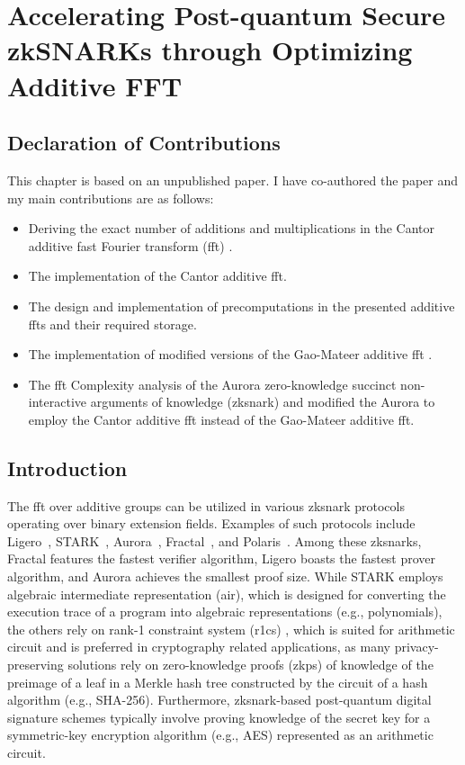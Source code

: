 \chapter{Accelerating Post-quantum Secure zkSNARKs through Optimizing Additive FFT}\label{ch:additive-fft}

\section*{Declaration of Contributions}
This chapter is based on an unpublished paper. I have co-authored the paper and my main contributions are as follows:
\begin{itemize}
	\item Deriving the exact number of additions and multiplications in the Cantor additive fast Fourier transform (\gls{fft}) \cite{Cantor1989FFT}. 
	\item The \CC implementation of the Cantor additive \gls{fft}.
	\item The design and implementation of precomputations in the presented additive \gls{fft}s and their required storage.
	\item The \CC implementation of modified versions of the Gao-Mateer additive \gls{fft} \cite{Gao2010FFT}.
	\item  The \gls{fft} Complexity analysis of the Aurora zero-knowledge succinct non-interactive arguments of knowledge (\gls{zksnark}) and modified the Aurora  \CC  to employ  the Cantor additive \gls{fft} instead of  the Gao-Mateer additive \gls{fft}.
\end{itemize}

\section{Introduction}

The \gls{fft} over additive groups can be utilized in various \gls{zksnark} protocols operating over binary extension fields. Examples of such protocols include Ligero~\cite{Ames2017Ligero}, STARK~\cite{Ben-Sasson2018STARK}, Aurora~\cite{Aurora2019}, Fractal~\cite{Chiesa2020Fractal}, and Polaris~\cite{Polaris}. Among these \gls{zksnark}s, Fractal features the fastest verifier algorithm, Ligero boasts the fastest prover algorithm, and Aurora achieves the smallest proof size. While STARK employs algebraic intermediate representation (\gls{air}), which is designed for converting the execution trace of a program into algebraic representations (e.g., polynomials), the others rely on rank-1 constraint system (\gls{r1cs}) \cite{Gong2024}, which is suited for arithmetic circuit and is preferred in cryptography related applications, as many privacy-preserving solutions rely on zero-knowledge proofs (\gls{zkp}s) of knowledge of the preimage of a leaf in a Merkle hash tree constructed by the circuit of a hash algorithm (e.g., SHA-256). Furthermore, \gls{zksnark}-based post-quantum digital signature schemes typically involve proving knowledge of the secret key for a symmetric-key encryption algorithm (e.g., AES) represented as an arithmetic circuit.

